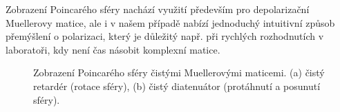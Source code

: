 Zobrazení Poincarého sféry nachází využití především pro depolarizační Muellerovy matice, ale i v našem případě nabízí jednoduchý intuitivní způsob přemýšlení o polarizaci, který je důležitý např. při rychlých rozhodnutích v laboratoři, kdy není čas násobit komplexní matice.

\begin{figure}[htbp]
    \centering
    \begin{subfigure}{.3\textwidth}
        \centering
        
    \end{subfigure}
    \begin{subfigure}{.67\textwidth}
        \centering
        
    \end{subfigure}
    \caption{Zobrazení Poincarého sféry čistými Muellerovými maticemi. (a) čistý retardér (rotace sféry), (b) čistý diatenuátor (protáhnutí a posunutí sféry).}
    \label{fig:UH-Mueller}
\end{figure}
